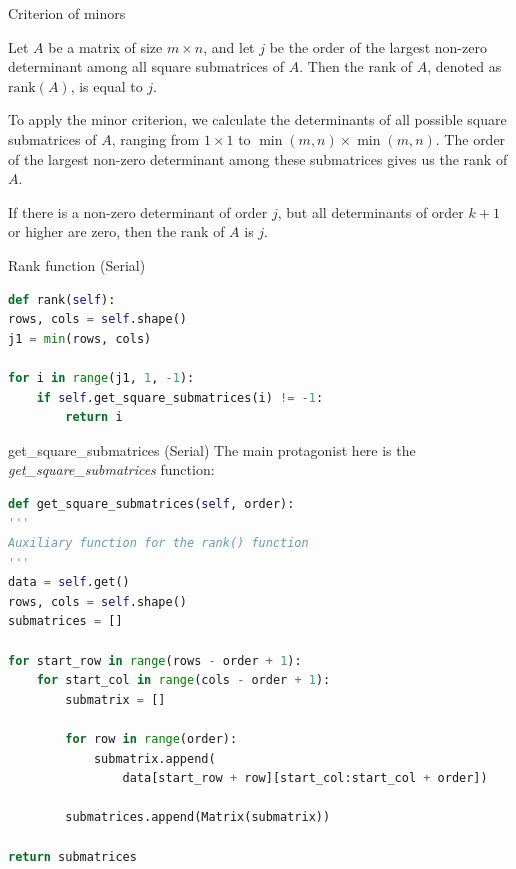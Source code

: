 \documentclass{beamer}
\begin{document}
\begin{frame}{Criterion of minors}

    Let $A$ be a matrix of size $m \times n$, and let $j$ be the order of the largest non-zero determinant among all square submatrices of $A$. Then the rank of $A$, denoted as $\text{rank}(A)$, is equal to $j$.

    To apply the minor criterion, we calculate the determinants of all possible square submatrices of $A$, ranging from $1 \times 1$ to $\min(m,n) \times \min(m,n)$. The order of the largest non-zero determinant among these submatrices gives us the rank of $A$.

    If there is a non-zero determinant of order $j$, but all determinants of order $k+1$ or higher are zero, then the rank of $A$ is $j$.
\end{frame}

\begin{frame}[fragile]{Rank function (Serial)}
    \begin{lstlisting}[language=Python]
def rank(self):
rows, cols = self.shape()
j1 = min(rows, cols)

for i in range(j1, 1, -1):
    if self.get_square_submatrices(i) != -1:
        return i
        \end{lstlisting}
\end{frame}

\begin{frame}[fragile]{get\_square\_submatrices (Serial)}
    The main protagonist here is the \textit{get\_square\_submatrices} function:
    \begin{lstlisting}[language=Python]
def get_square_submatrices(self, order):
'''
Auxiliary function for the rank() function
'''
data = self.get()
rows, cols = self.shape()
submatrices = []

for start_row in range(rows - order + 1):
    for start_col in range(cols - order + 1):
        submatrix = []

        for row in range(order):
            submatrix.append(
                data[start_row + row][start_col:start_col + order])

        submatrices.append(Matrix(submatrix))

return submatrices
                    \end{lstlisting}
\end{frame}
\end{document}
